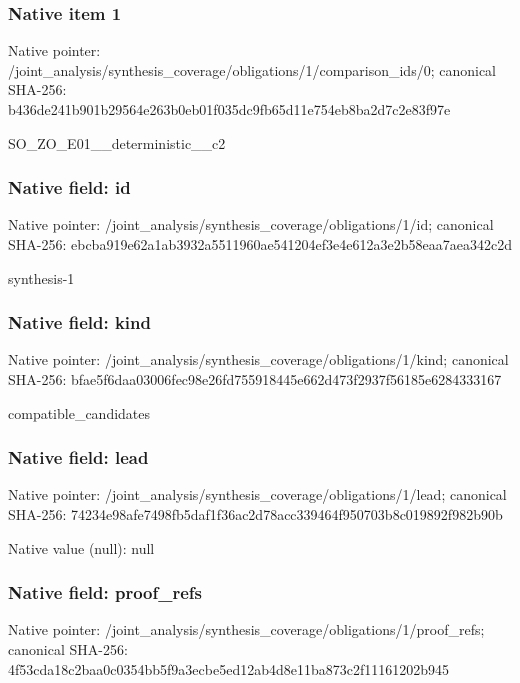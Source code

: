 \documentclass[10pt,a4paper]{article}
\begin{document}
\subsubsection{Native item 1}
Native pointer: /joint\_\allowbreak{}analysis/synthesis\_\allowbreak{}coverage/obligations/1/comparison\_\allowbreak{}ids/0; canonical SHA-256: b436de241b901b29564e263b0eb01f035dc9fb65d11e754eb8ba2d7c2e83f97e

\begingroup\raggedright\sloppy SO\_\allowbreak{}ZO\_\allowbreak{}E01\_\allowbreak{}\_\allowbreak{}deterministic\_\allowbreak{}\_\allowbreak{}c2\par\endgroup

\subsubsection{Native field: id}
Native pointer: /joint\_\allowbreak{}analysis/synthesis\_\allowbreak{}coverage/obligations/1/id; canonical SHA-256: ebcba919e62a1ab3932a5511960ae541204ef3e4e612a3e2b58eaa7aea342c2d

\begingroup\raggedright\sloppy synthesis-1\par\endgroup

\subsubsection{Native field: kind}
Native pointer: /joint\_\allowbreak{}analysis/synthesis\_\allowbreak{}coverage/obligations/1/kind; canonical SHA-256: bfae5f6daa03006fec98e26fd755918445e662d473f2937f56185e6284333167

\begingroup\raggedright\sloppy compatible\_\allowbreak{}candidates\par\endgroup

\subsubsection{Native field: lead}
Native pointer: /joint\_\allowbreak{}analysis/synthesis\_\allowbreak{}coverage/obligations/1/lead; canonical SHA-256: 74234e98afe7498fb5daf1f36ac2d78acc339464f950703b8c019892f982b90b

Native value (null): null

\subsubsection{Native field: proof\_\allowbreak{}refs}
Native pointer: /joint\_\allowbreak{}analysis/synthesis\_\allowbreak{}coverage/obligations/1/proof\_\allowbreak{}refs; canonical SHA-256: 4f53cda18c2baa0c0354bb5f9a3ecbe5ed12ab4d8e11ba873c2f11161202b945
\end{document}
